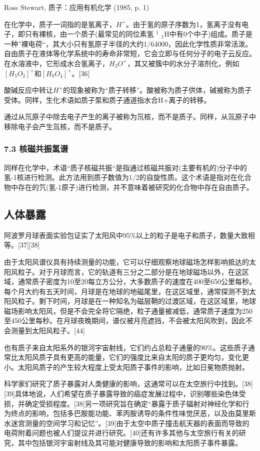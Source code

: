 Ross Stewart, 质子：应用有机化学 (1985, p. 1)

在化学中，质子一词指的是氢离子，$H^+$。由于氢的原子序数为1，氢离子没有电子，即只有裸核，由一个质子(最常见的同位素氢 $^1$ $_1\text{H}$中有0个中子)组成。质子是一种”裸电荷“，其大小只有氢原子半径的大约1/64000，因此化学性质非常活泼。自由质子在液体等化学系统中的寿命非常短，它会立即与任何分子的电子云反应。在水溶液中，它形成水合氢离子，$H_3O^+$，其又被簇中的水分子溶剂化，例如$[H_5O_2]^+\text{和}[H_9O_4]^+$。[36]

酸碱反应中转让$H^+$的现象被称为“质子转移”。酸被称为质子供体，碱被称为质子受体。同样，生化术语如质子泵和质子通道指水合H+离子的转移。

通过从氘原子中除去电子产生的离子被称为氘核，而不是质子。同样，从氚原子中移除电子会产生氚核，而不是质子。

\subsubsection{7.3 核磁共振氢谱}
同样在化学中，术语“质子核磁共振“是指通过核磁共振对(主要有机的)分子中的氢-1核进行检测。此方法用到质子数值为$1/2$的自旋性质。这个术语是指对在化合物中存在的氕(氢-1原子)进行检测，并不意味着被研究的化合物中存在自由质子。

\subsection{人体暴露}
阿波罗月球表面实验包证实了太阳风中95\%以上的粒子是电子和质子，数量大致相等。[37][38]

由于太阳风谱仪具有持续测量的功能，它可以仔细观察地球磁场怎样影响抵达的太阳风粒子。对于月球而言，它的轨道有三分之二部分是在地球磁场以外，在这区域，通常质子密度为10至20每立方公分，大多数质子的速度在400至650公里每秒。每个月大约有五天时间，月球是在地球的地磁尾里，在这区域里，通常探测不到太阳风粒子。剩下时间，月球是在一种知名为磁层鞘的过渡区域，在这区域里，地球磁场影响太阳风，但是不会完全将它隔绝，粒子通量被减低，通常质子速度为250至450公里每秒。在月球夜晚期间，谱仪被月亮遮挡，不会被太阳风吹到，因此不会测量到太阳风粒子。[44]

也有质子来自太阳系外的银河宇宙射线，它们约占总粒子通量的90\%。这些质子通常比太阳风质子具有更高的能量，它们的强度比来自太阳的质子更均匀，变化更小。太阳风质子的产生较大程度上受太阳质子事件的影响，比如日冕物质抛射。

科学家们研究了质子暴露对人类健康的影响，这通常可以在太空旅行中找到。[38][39]具体地说，人们希望在质子暴露导致的癌症发展过程中，识别哪些染色体受损，并确定受损程度。[38]另一项研究旨在确定“暴露于质子辐射对神经化学和行为终点的影响，包括多巴胺能功能、苯丙胺诱导的条件性味觉厌恶，以及由莫里斯水迷宫测量的空间学习和记忆”。[39]由于太空中质子撞击航天器的表面而导致的电荷附着问题也被人们提议并进行研究。[40]还有许多其他与太空旅行有关的研究，其中包括银河宇宙射线及其可能对健康导致的影响和太阳质子事件暴露。

